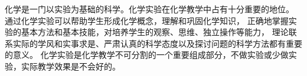 \label{sec:xssy-mudi}

化学是一门以实验为基础的科学。化学实验在化学教学中占有十分重要的地位。
通过化学实验可以帮助学生形成化学概念，理解和巩固化学知识，
正确地掌握实验的基本方法和基本技能，对培养学生的观察、思维、独立操作等能力，
理论联系实际的学风和实事求是、严肃认真的科学态度以及探讨问题的科学方法都有重要的意义。
化学实验是化学教学不可分割的一个重要组成部分，不做实验或少做实验，实际教学效果是不会好的。

